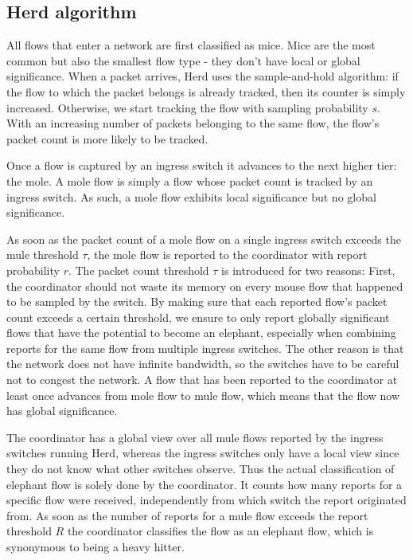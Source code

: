 \documentclass[11pt,oneside,a4paper]{article}
\begin{document}
\subsection{Herd algorithm} \label{animals}

All flows that enter a network are first classified as mice. Mice are the most common but also the smallest flow type - they don't have local or global significance. When a packet arrives, Herd uses the sample-and-hold algorithm: if the flow to which the packet belongs is already tracked, then its counter is simply increased. Otherwise, we start tracking the flow with sampling probability $s$. With an increasing number of packets belonging to the same flow, the flow's packet count is more likely to be tracked.

\noindent Once a flow is captured by an ingress switch it advances to the next higher tier: the mole. A mole flow is simply a flow whose packet count is tracked by an ingress switch. As such, a mole flow exhibits local significance but no global significance.

\noindent As soon as the packet count of a mole flow on a single ingress switch exceeds the mule threshold $\tau$, the mole flow is reported to the coordinator with report probability $r$. The packet count threshold $\tau$ is introduced for two reasons: First, the coordinator should not waste its memory on every mouse flow that happened to be sampled by the switch. By making sure that each reported flow's packet count exceeds a certain threshold, we ensure to only report globally significant flows that have the potential to  become an elephant, especially when combining reports for the same flow from multiple ingress switches. The other reason is that the network does not have infinite bandwidth, so the switches have to be careful not to congest the network. A flow that has been reported to the coordinator at least once advances from mole flow to mule flow, which means that the flow now has global significance.

\newpage

The coordinator has a global view over all mule flows reported by the ingress switches running Herd, whereas the ingress switches only have a local view since they do not know what other switches observe. Thus the actual classification of elephant flow is solely done by the coordinator. It counts how many reports for a specific flow were received, independently from which switch the report originated from. As soon as the number of reports for a mule flow exceeds the report threshold $R$ the coordinator classifies the flow as an elephant flow, which is synonymous to being a heavy hitter.
\end{document}
